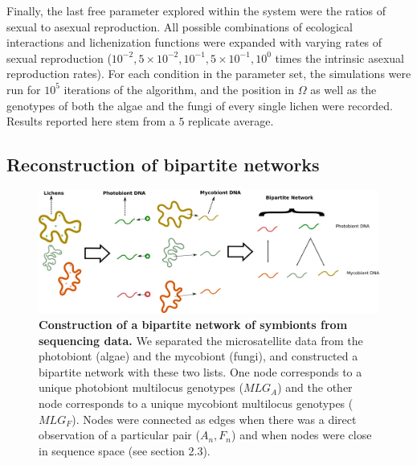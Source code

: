 \documentclass[fleqn,10pt]{wlscirep}
\begin{document}
Finally, the last free parameter explored within the system were the ratios of sexual to asexual reproduction. All possible combinations of ecological interactions and lichenization functions were expanded with varying rates of sexual reproduction ($10^{-2}, 5\times10^{-2},10^{-1},5\times10^{-1},10^0$ times the intrinsic asexual reproduction rates). For each condition in the parameter set, the simulations were run for $10^5$ iterations of the algorithm, and the position in $\Omega$ as well as the genotypes of both the algae and the fungi of every single lichen were recorded. Results reported here stem from a $5$ replicate average.

\subsection{Reconstruction of bipartite networks}
\label{sec:mat:reco}

\begin{figure}
\centering
\includegraphics[width=.7\textwidth]{img/bipartite_howto}
\caption{{\bf Construction of a bipartite network of symbionts from sequencing data.} We separated the microsatellite data from the photobiont (algae) and the mycobiont (fungi), and constructed a bipartite network with these two lists. One node corresponds to a unique photobiont multilocus genotypes ($MLG_A$) and the other node corresponds to a unique mycobiont multilocus genotypes ($MLG_F$). Nodes were connected as edges when there was a direct observation of a particular pair ($A_n, F_n$) and when nodes were close in sequence space (see section 2.3).}
\label{fig:bipartite_howto}
\end{figure}
\end{document}
